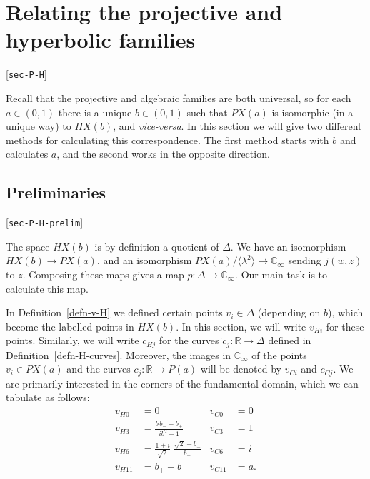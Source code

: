 \documentclass[reqno]{amsart}
\newcommand{\lbl}[1]{\label{#1}\textup{[\texttt{#1}]}\par}
\newcommand{\lbl}{\label}
\newcommand{\Dl}        {\Delta}
\newcommand{\lm}        {\lambda}
\newcommand{\R}         {{\mathbb{R}}}
\newcommand{\C}         {{\mathbb{C}}}
\newcommand{\ip}[1]     {\langle #1\rangle}
\newcommand{\rt}        {\sqrt{2}}
\newcommand{\tc}	{\widetilde{c}}
\renewcommand{\:}{\colon}
\theoremstyle{definition}
\begin{document}
\section{Relating the projective and hyperbolic families}
\lbl{sec-P-H}

Recall that the projective and algebraic families are both universal,
so for each $a\in(0,1)$ there is a unique $b\in (0,1)$ such that
$PX(a)$ is isomorphic (in a unique way) to $HX(b)$, and
\emph{vice-versa}.  In this section we will give two different methods
for calculating this correspondence.  The first method starts with $b$
and calculates $a$, and the second works in the opposite direction.

\subsection{Preliminaries}
\lbl{sec-P-H-prelim}

The space $HX(b)$ is by definition a quotient of $\Dl$.  We have an
isomorphism $HX(b)\to PX(a)$, and an isomorphism
$PX(a)/\ip{\lm^2}\to\C_\infty$ sending $j(w,z)$ to $z$.  Composing
these maps gives a map $p\:\Dl\to\C_\infty$.  Our main task is to
calculate this map.

In Definition~\ref{defn-v-H} we defined certain points $v_i\in\Dl$
(depending on $b$), which become the labelled points in $HX(b)$.  In
this section, we will write $v_{Hi}$ for these points.  Similarly, we
will write $c_{Hj}$ for the curves $\tc_j\:\R\to\Dl$ defined in
Definition~\ref{defn-H-curves}.  Moreover, the images in
$\C_\infty$ of the points $v_i\in PX(a)$ and the curves
$c_j\:\R\to P(a)$ will be denoted by $v_{Ci}$ and $c_{Cj}$.  We are
primarily interested in the corners of the fundamental domain, which
we can tabulate as follows:
\begin{align*}
 v_{H0}  &= 0 &
 v_{C0}  &= 0 \\
 v_{H3}  &= \frac{b\,b_--b_+}{ib^2-1} &
 v_{C3}  &= 1 \\
 v_{H6}  &= \frac{1+i}{\rt}\;\frac{\rt-b_-}{b_+} &
 v_{C6}  &= i \\
 v_{H11} &= b_+-b &
 v_{C11} &= a.
\end{align*}
\end{document}
